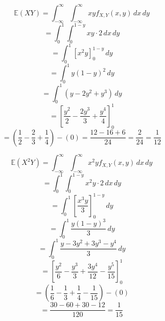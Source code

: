 \documentclass{article}
\begin{document}
   
    \[\mathbb{E}(XY) = \int_{-\infty}^{\infty} \int_{-\infty}^{\infty} xy f_{X,Y}(x,y) \, dx \, dy\]
    \[= \int_{0}^{1} \int_{0}^{1-y} xy \cdot 2 \, dx \, dy\]
    \[= \int_{0}^{1} \left[x^2y\right]_{0}^{1-y} \, dy\]
    \[= \int_{0}^{1} y(1-y)^2 \, dy\] 
    \[= \int_{0}^{1} (y-2y^2+y^3) \, dy\]
    \[= \left[\frac{y^2}{2}-\frac{2y^3}{3}+\frac{y^4}{4}\right]_{0}^{1}\]
    \[= \left(\frac{1}{2}-\frac{2}{3}+\frac{1}{4}\right) - (0) = \frac{12-16+6}{24} = \frac{2}{24} = \boxed{\frac{1}{12}}\]

    \[\mathbb{E}(X^2Y) = \int_{-\infty}^{\infty} \int_{-\infty}^{\infty} x^2y f_{X,Y}(x,y) \, dx \, dy\]
    \[= \int_{0}^{1} \int_{0}^{1-y} x^2y \cdot 2 \, dx \, dy\]
    \[= \int_{0}^{1} \left[\frac{x^3y}{3}\right]_{0}^{1-y} \, dy\]
    \[= \int_{0}^{1} \frac{y(1-y)^3}{3} \, dy\]
    \[= \int_{0}^{1} \frac{y-3y^2+3y^3-y^4}{3} \, dy\]
    \[= \left[\frac{y^2}{6}-\frac{y^3}{3}+\frac{3y^4}{12}-\frac{y^5}{15}\right]_{0}^{1}\]
    \[= \left(\frac{1}{6}-\frac{1}{3}+\frac{1}{4}-\frac{1}{15}\right) - (0)\]
    \[= \frac{30-60+30-12}{120} = \boxed{\frac{1}{15}}\]

    \pagebreak















        
\end{document}
